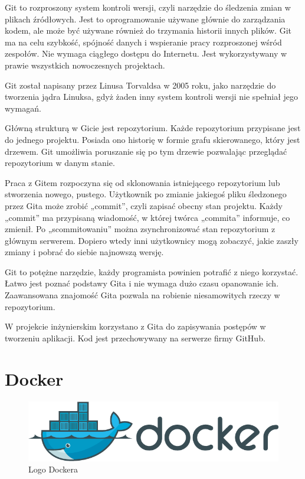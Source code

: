     Git to rozproszony system kontroli wersji, czyli narzędzie do śledzenia zmian w plikach źródłowych.
    Jest to oprogramowanie używane głównie do zarządzania kodem, ale może być używane również do trzymania historii innych plików.
    Git ma na celu szybkość, spójność danych i wspieranie pracy rozproszonej wśród zespołów.
    Nie wymaga ciągłego dostępu do Internetu.
    Jest wykorzystywany w prawie wszystkich nowoczesnych projektach.

    Git został napisany przez Linusa Torvaldsa w 2005 roku, jako narzędzie do tworzenia jądra Linuksa, gdyż żaden inny system kontroli wersji nie spełniał jego wymagań.

    Główną strukturą w Gicie jest repozytorium.
    Każde repozytorium przypisane jest do jednego projektu.
    Posiada ono historię w formie grafu skierowanego, który jest drzewem.
    Git umożliwia poruszanie się po tym drzewie pozwalając przeglądać repozytorium w danym stanie.

    Praca z Gitem rozpoczyna się od sklonowania istniejącego repozytorium lub stworzenia nowego, pustego.
    Użytkownik po zmianie jakiegoś pliku śledzonego przez Gita może zrobić „commit”, czyli zapisać obecny stan projektu.
    Każdy „commit” ma przypisaną wiadomość, w której twórca „commita” informuje, co zmienił.
    Po „scommitowaniu” można zsynchronizować stan repozytorium z głównym serwerem.
    Dopiero wtedy inni użytkownicy mogą zobaczyć, jakie zaszły zmiany i pobrać do siebie najnowszą wersję.

    Git to potężne narzędzie, każdy programista powinien potrafić z niego korzystać.
    Łatwo jest poznać podstawy Gita i nie wymaga dużo czasu opanowanie ich.
    Zaawansowana znajomość Gita pozwala na robienie niesamowitych rzeczy w repozytorium.

    W projekcie inżynierskim korzystano z Gita do zapisywania postępów w tworzeniu aplikacji.
    Kod jest przechowywany na serwerze firmy GitHub.

    \section{Docker}\label{sec:docker}

    \begin{figure}[htp]
        \centering
        \includegraphics[scale=0.4]{./img/docker-logo.png}
        \caption{Logo Dockera}
    \end{figure}

